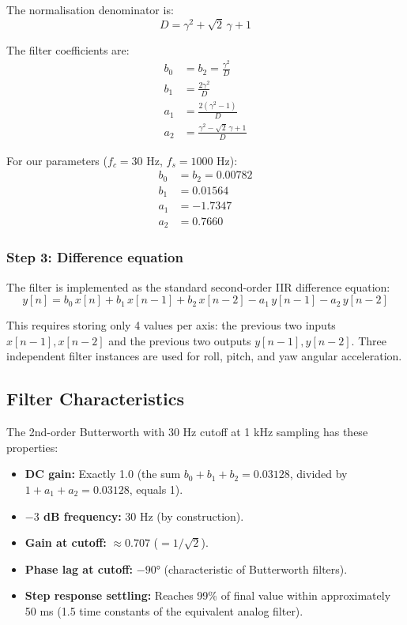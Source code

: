 \documentclass[12pt, a4paper]{article}
\begin{document}
The normalisation denominator is:
\begin{equation}
    D = \gamma^2 + \sqrt{2}\,\gamma + 1
\end{equation}

The filter coefficients are:
\begin{align}
    b_0 &= b_2 = \frac{\gamma^2}{D} \\
    b_1 &= \frac{2\gamma^2}{D} \\
    a_1 &= \frac{2(\gamma^2 - 1)}{D} \\
    a_2 &= \frac{\gamma^2 - \sqrt{2}\,\gamma + 1}{D}
\end{align}

For our parameters ($f_c = 30$ Hz, $f_s = 1000$ Hz):
\begin{align}
    b_0 &= b_2 = 0.00782 \\
    b_1 &= 0.01564 \\
    a_1 &= -1.7347 \\
    a_2 &= 0.7660
\end{align}

\subsubsection{Step 3: Difference equation}

The filter is implemented as the standard second-order IIR difference equation:
\begin{equation}
    y[n] = b_0 \, x[n] + b_1 \, x[n{-}1] + b_2 \, x[n{-}2] - a_1 \, y[n{-}1] - a_2 \, y[n{-}2]
\end{equation}

This requires storing only 4 values per axis: the previous two inputs $x[n{-}1], x[n{-}2]$ and the previous two outputs $y[n{-}1], y[n{-}2]$.  Three independent filter instances are used for roll, pitch, and yaw angular acceleration.

\subsection{Filter Characteristics}

The 2nd-order Butterworth with 30 Hz cutoff at 1 kHz sampling has these properties:
\begin{itemize}
    \item \textbf{DC gain:} Exactly 1.0 (the sum $b_0 + b_1 + b_2 = 0.03128$, divided by $1 + a_1 + a_2 = 0.03128$, equals 1).
    \item \textbf{$-3$ dB frequency:} 30 Hz (by construction).
    \item \textbf{Gain at cutoff:} $\approx 0.707$ ($= 1/\sqrt{2}$).
    \item \textbf{Phase lag at cutoff:} $-90°$ (characteristic of Butterworth filters).
    \item \textbf{Step response settling:} Reaches 99\% of final value within approximately 50 ms (1.5 time constants of the equivalent analog filter).
\end{itemize}
\end{document}
